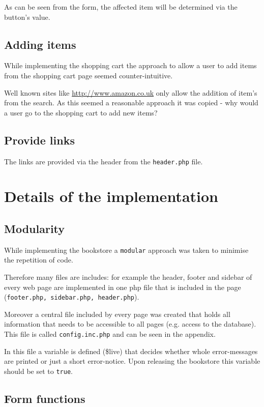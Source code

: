 As can be seen from the form, the affected item will be determined via the button's value.

\subsection{Adding items}

While implementing the shopping cart the approach to allow a user to add items from the shopping cart page seemed counter-intuitive.

Well known sites like \url{http://www.amazon.co.uk} only allow the addition of item's from the search.
As this seemed a reasonable approach it was copied - why would a user go to the shopping cart to add new items?

\subsection{Provide links}

The links are provided via the header from the \texttt{header.php} file.

\section{Details of the implementation}
\label{sec:details_implementation}

\subsection{Modularity}

While implementing the bookstore a \texttt{modular} approach was taken to minimise the repetition of code.

Therefore many files are includes: for example the header, footer and sidebar of every web page are implemented in one php file that is included in the page (\texttt{footer.php, sidebar.php, header.php}).

Moreover a central file included by every page was created that holds all information that needs to be accessible to all pages (e.g. access to the database). This file is called \texttt{config.inc.php} and can be seen in the appendix.

In this file a variable is defined (\$live) that decides whether whole error-messages are printed or just a short error-notice. Upon releasing the bookstore this variable should be set to \texttt{true}.

\subsection{Form functions}

